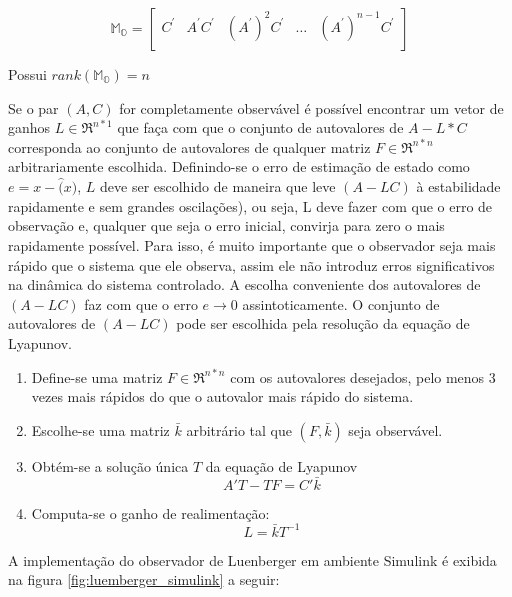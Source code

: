 \begin{equation}\label{eq:Matrix:MO}
    \mathbb{M_O}=
    \begin{bmatrix}
        C^'&A^'C^'&(A^')^2C^'&\dots&(A^')^{n-1}C^'\\
    \end{bmatrix}        
\end{equation}

Possui $rank(\mathbb{M_O}) = n$
 
Se o par $(A,C)$ for completamente observável é possível encontrar um vetor de ganhos $L\in \Re^{n*1}$ que faça com que o conjunto de autovalores de $A-L*C$ corresponda ao conjunto de autovalores de qualquer matriz $F \in \Re^{n*n}$ arbitrariamente escolhida. 
Definindo-se o erro de estimação de estado como $e=x-\hat(x)$, $L$ deve ser escolhido de maneira que leve $(A-LC)$ à estabilidade rapidamente e sem grandes oscilações), ou seja, L deve fazer com que o erro de observação e,
qualquer que seja o erro inicial, convirja para zero o mais rapidamente possível. Para isso, é muito importante que o observador seja mais rápido 
que o sistema que ele observa, assim ele não introduz erros significativos na dinâmica do sistema controlado. A escolha conveniente dos autovalores de $(A-LC)$ faz com que o erro $e\rightarrow0$ assintoticamente. 
O conjunto de autovalores de $(A-LC)$ pode ser escolhida pela resolução da equação de Lyapunov.
    
\begin{enumerate}
    \item Define-se uma matriz $F \in \Re^{n*n}$ com os autovalores desejados, pelo menos 3 vezes mais rápidos do que o autovalor mais rápido do sistema.
    \item Escolhe-se uma matriz $\bar{k}$ arbitrário tal que $(F,\bar{k})$ seja observável.
    \item {Obtém-se a solução única $T$ da equação de Lyapunov
    \begin{equation} \label{eq:lyapunov}
            A'T-TF=C'\bar{k}
    \end{equation}}
    \item {Computa-se o ganho de realimentação:
    \begin{equation} \label{eq:ganho}
            L=\bar{k}T^{-1}
    \end{equation}}
\end{enumerate}  

A implementação do observador de Luenberger em ambiente Simulink é exibida na figura \ref{fig:luemberger_simulink} a seguir:

